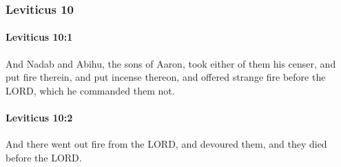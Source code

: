 	\subsubsection{Leviticus 10} %
		\label{LEVITICUS-10}

		\paragraph{Leviticus 10:1} %
			\label{LEVITICUS-10-1}

			And Nadab and Abihu, the sons of Aaron, took either of them his censer, and put fire therein, and put incense thereon, and offered strange fire before the LORD, which he commanded them not.


		\paragraph{Leviticus 10:2} %
			\label{LEVITICUS-10-2}

			And there went out fire from the LORD, and devoured them, and they died before the LORD.

